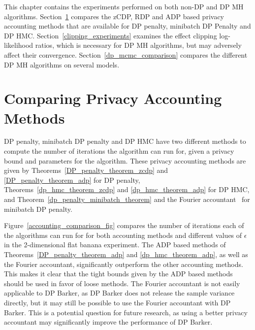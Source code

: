 \documentclass[english,twoside,openright]{HYgraduMLDS}
\begin{document}
This chapter contains the experiments performed on both non-DP and DP MH
algorithms. Section~\ref{accounting_comparison_section} compares the
zCDP, RDP and ADP based privacy accounting methods that are available
for DP penalty, minibatch DP Penalty and DP HMC.
Section~\ref{clipping_experiments}
examines the effect clipping log-likelihood ratios, which is necessary for
DP MH algorithms, but may adversely affect their convergence.
Section~\ref{dp_mcmc_comparison} compares the different DP MH algorithms
on several models.

\section{Comparing Privacy Accounting Methods}\label{accounting_comparison_section}

DP penalty, minibatch DP penalty and DP HMC have two different methods to
compute the number of iterations the algorithm can run for, given a privacy
bound and parameters for the algorithm. These privacy accounting methods
are given by Theorems~\ref{DP_penalty_theorem_zcdp} and
\ref{DP_penalty_theorem_adp} for DP penalty, Theorems~\ref{dp_hmc_theorem_zcdp}
and \ref{dp_hmc_theorem_adp} for DP HMC, and
Theorem~\ref{dp_penalty_minibatch_theorem} and the Fourier
accountant~\cite{KJH20} for minibatch DP penalty.

Figure~\ref{accounting_comparison_fig} compares the number of iterations
each of the algorithms can run for for both accounting methods and different
values of \(\epsilon\) in the 2-dimensional flat banana experiment.
The ADP based methods of Theorems~\ref{DP_penalty_theorem_adp}
and \ref{dp_hmc_theorem_adp}, as well as the Fourier accountant, significantly
outperform the other accounting methods. This makes it clear that the tight
bounds given by the ADP based methods should be used in favor of loose methods.
The Fourier accountant is not easily applicable to DP Barker, as DP Barker
does not release the sample variance directly, but it may still be possible
to use the Fourier accountant with DP Barker. This is a potential question
for future research, as using a better privacy accountant may significantly
improve the performance of DP Barker.
\end{document}
